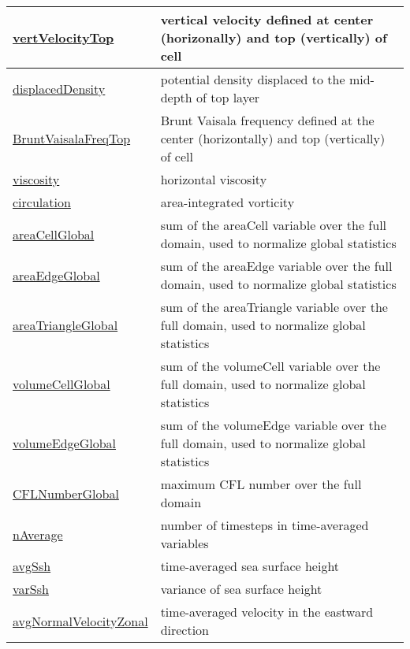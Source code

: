 {\begin{center}
\begin{longtable}{| p{2.0in} | p{4.0in} |}
	\hline
	\hyperref[subsec:var_sec_state_vertVelocityTop]{vertVelocityTop} & vertical velocity defined at center (horizonally) and top (vertically) of cell \\
	\hline
	\hyperref[subsec:var_sec_state_displacedDensity]{displacedDensity} & potential density displaced to the mid-depth of top layer \\
	\hline
	\hyperref[subsec:var_sec_state_BruntVaisalaFreqTop]{BruntVaisalaFreqTop} & Brunt Vaisala frequency defined at the center (horizontally) and top (vertically) of cell \\
	\hline
	\hyperref[subsec:var_sec_state_viscosity]{viscosity} & horizontal viscosity \\
	\hline
	\hyperref[subsec:var_sec_state_circulation]{circulation} & area-integrated vorticity \\
	\hline
	\hyperref[subsec:var_sec_state_areaCellGlobal]{areaCellGlobal} & sum of the areaCell variable over the full domain, used to normalize global statistics \\
	\hline
	\hyperref[subsec:var_sec_state_areaEdgeGlobal]{areaEdgeGlobal} & sum of the areaEdge variable over the full domain, used to normalize global statistics \\
	\hline
	\hyperref[subsec:var_sec_state_areaTriangleGlobal]{areaTriangleGlobal} & sum of the areaTriangle variable over the full domain, used to normalize global statistics \\
	\hline
	\hyperref[subsec:var_sec_state_volumeCellGlobal]{volumeCellGlobal} & sum of the volumeCell variable over the full domain, used to normalize global statistics \\
	\hline
	\hyperref[subsec:var_sec_state_volumeEdgeGlobal]{volumeEdgeGlobal} & sum of the volumeEdge variable over the full domain, used to normalize global statistics \\
	\hline
	\hyperref[subsec:var_sec_state_CFLNumberGlobal]{CFLNumberGlobal} & maximum CFL number over the full domain \\
	\hline
	\hyperref[subsec:var_sec_state_nAverage]{nAverage} & number of timesteps in time-averaged variables \\
	\hline
	\hyperref[subsec:var_sec_state_avgSsh]{avgSsh} & time-averaged sea surface height \\
	\hline
	\hyperref[subsec:var_sec_state_varSsh]{varSsh} & variance of sea surface height \\
	\hline
	\hyperref[subsec:var_sec_state_avgNormalVelocityZonal]{avgNormalVelocityZonal} & time-averaged velocity in the eastward direction \\

\end{longtable}
\end{center}}
